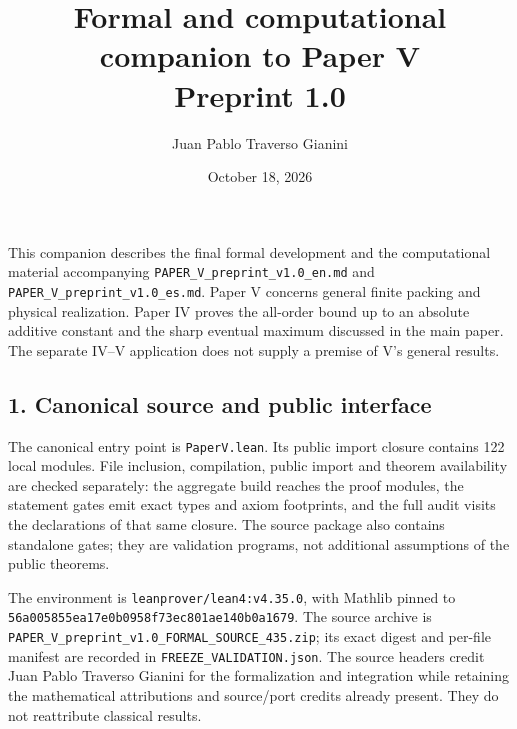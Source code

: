 \documentclass[english,11pt,a4paper]{article}
\title{Formal and computational companion to Paper V\\Preprint 1.0}
\author{Juan Pablo Traverso Gianini}
\date{October 18, 2026}
\begin{document}
\raggedbottom
\maketitle
\setlength{\parskip}{5pt}
This companion describes the final formal development and the
computational material accompanying
\nolinkurl{PAPER_V_preprint_v1.0_en.md} and
\nolinkurl{PAPER_V_preprint_v1.0_es.md}. Paper V concerns general
finite packing and physical realization. Paper IV proves the all-order
bound up to an absolute additive constant and the sharp eventual maximum
discussed in the main paper. The separate IV--V application does not
supply a premise of V's general results.

\subsection{1. Canonical source and public
interface}\label{canonical-source-and-public-interface}

The canonical entry point is \texttt{PaperV.lean}. Its public import
closure contains 122 local modules. File inclusion, compilation, public
import and theorem availability are checked separately: the aggregate
build reaches the proof modules, the statement gates emit exact types
and axiom footprints, and the full audit visits the declarations of that
same closure. The source package also contains standalone gates; they
are validation programs, not additional assumptions of the public
theorems.

The environment is \texttt{leanprover/lean4:v4.35.0}, with Mathlib
pinned to \nolinkurl{56a005855ea17e0b0958f73ec801ae140b0a1679}. The source
archive is \nolinkurl{PAPER_V_preprint_v1.0_FORMAL_SOURCE_435.zip};
its exact digest and per-file manifest are recorded in
\nolinkurl{FREEZE_VALIDATION.json}. The source headers credit Juan Pablo
Traverso Gianini for the formalization and integration while retaining
the mathematical attributions and source/port credits already present.
They do not reattribute classical results.
\end{document}
